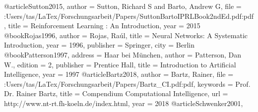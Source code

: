@article{Sutton2015,
author = {Sutton, Richard S and Barto, Andrew G},
file = {:Users/tas/LaTex/Forschungsarbeit/Papers/SuttonBartoIPRLBook2ndEd.pdf:pdf},
title = {{Reinforcement Learning : An Introduction}},
year = {2015}
}
@book{Rojas1996,
author = {Rojas, Raúl},
title = {{Neural Networks: A Systematic Introduction}},
year = {1996},
publisher = {Springer},
city = {Berlin}
}
@book{Patterson1997,
address = {Haar bei M{\"{u}}nchen},
author = {Patterson, Dan W.},
edition = {2},
publisher = {Prentice Hall},
title = {{Introduction to Artificial Intelligence}},
year = {1997}
}
@article{Bartz2018,
author = {Bartz, Rainer},
file = {:Users/tas/LaTex/Forschungsarbeit/Papers/Bartz{\_}CI.pdf:pdf},
keywords = {Prof. Dr. Rainer Bartz},
title = {{Compendium Computational Intelligence}},
url = {http://www.nt-rt.fh-koeln.de/index.html},
year = {2018}
}
@article{Schwenker2001,
}
